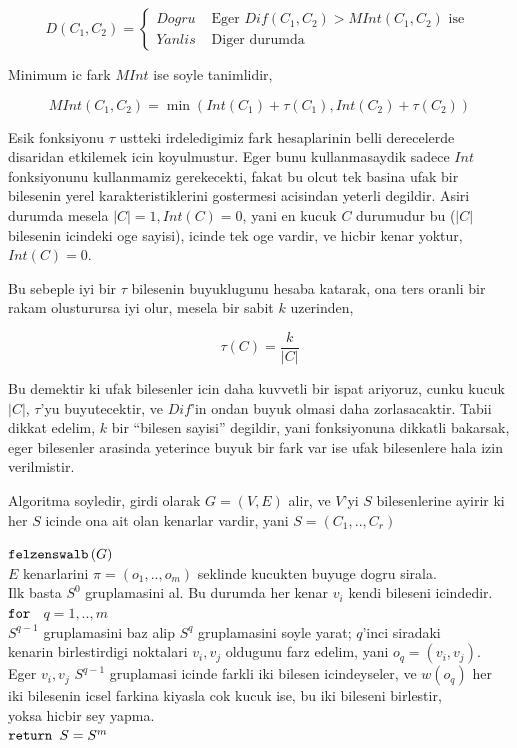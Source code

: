 \documentclass[12pt,fleqn]{article}\usepackage{../common}
\begin{document}
$$ 
D(C_1,C_2) = 
\left\{ \begin{array}{ll}
Dogru & \textrm{ Eger } Dif(C_1,C_2) > MInt(C_1,C_2) \textrm{ ise } \\
Yanlis & \textrm{ Diger durumda }
\end{array} \right.
 $$

Minimum ic fark $MInt$ ise soyle tanimlidir,

$$ 
MInt(C_1,C_2) = \min (Int(C_1)+\tau(C_1), Int(C_2)+\tau(C_2))
 $$

Esik fonksiyonu $\tau$ ustteki irdeledigimiz fark hesaplarinin belli
derecelerde disaridan etkilemek icin koyulmustur. Eger bunu kullanmasaydik
sadece $Int$ fonksiyonunu kullanmamiz gerekecekti, fakat bu olcut tek
basina ufak bir bilesenin yerel karakteristiklerini gostermesi acisindan yeterli
degildir. Asiri durumda mesela $|C| = 1,Int(C)=0$, yani en kucuk $C$
durumudur bu ($|C|$ bilesenin icindeki oge sayisi), icinde tek oge vardir,
ve hicbir kenar yoktur, $Int(C) = 0$.  

Bu sebeple iyi bir $\tau$ bilesenin buyuklugunu hesaba katarak, ona ters
oranli bir rakam olusturursa iyi olur, mesela bir sabit $k$ uzerinden,

$$ \tau(C) = \frac{k}{|C|} $$

Bu demektir ki ufak bilesenler icin daha kuvvetli bir ispat ariyoruz, cunku
kucuk $|C|$, $\tau$'yu buyutecektir, ve $Dif$'in ondan buyuk olmasi daha
zorlasacaktir. Tabii dikkat edelim, $k$ bir ``bilesen sayisi'' degildir,
yani fonksiyonuna dikkatli bakarsak, eger bilesenler arasinda yeterince
buyuk bir fark var ise ufak bilesenlere hala izin verilmistir.

Algoritma soyledir, girdi olarak $G=(V,E)$ alir, ve $V$'yi $S$
bilesenlerine ayirir ki her $S$ icinde ona ait olan kenarlar vardir, yani
$S=(C_1,..,C_r)$ 

\begin{algorithm}[h]
\begin{pseudocode}
\codename $\mbox{\texttt{felzenswalb}}\left(G\right)$\\
\codeline \> $E$ kenarlarini $\pi = (o_1,..,o_m)$ seklinde kucukten buyuge dogru sirala. \\
\codeline \> Ilk basta $S^0$ gruplamasini al. Bu durumda her kenar $v_i$
kendi bileseni icindedir. \\ 
\codeline \> $\mbox{\texttt{for }}$ $q = 1,..,m$ \\
\codeline \> \> $S^{q-1}$ gruplamasini baz alip $S^q$ gruplamasini soyle
yarat; $q$'inci siradaki  \\
\codeline \> \> kenarin birlestirdigi noktalari $v_i,v_j$ oldugunu farz
edelim, yani $o_q = (v_i,v_j)$. \\ 
\codeline \> \> Eger $v_i,v_j$ $S^{q-1}$ gruplamasi icinde farkli iki
bilesen icindeyseler, ve $w(o_q)$ her  \\
\codeline \> \> iki bilesenin icsel farkina kiyasla cok kucuk ise, bu iki
bileseni birlestir, \\ 
\codeline \> \> yoksa hicbir sey yapma. \\
\codeline \> $\mbox{\texttt{return }} S=S^m$ 
\end{pseudocode}
\end{algorithm}
\end{document}
